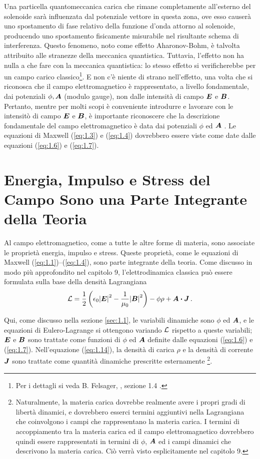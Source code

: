 Una particella quantomeccanica carica che rimane completamente all'esterno del solenoide sarà influenzata dal potenziale vettore in questa zona, ove esso causerà uno spostamento di fase relativo della funzione d'onda attorno al solenoide, producendo uno spostamento fisicamente misurabile nel risultante schema di interferenza. Questo fenomeno, noto come effetto Aharonov-Bohm, è talvolta attribuito alle stranezze della meccanica quantistica. Tuttavia, l'effetto non ha nulla a che fare con la meccanica quantistica: lo stesso effetto si verificherebbe per un campo carico classico\footnote{Per i dettagli si veda B. Felsager, , sezione 1.4 .}. 
E non c'è niente di strano nell'effetto, una volta che si riconosca che il campo elettromagnetico è rappresentato, a livello fondamentale, dai potenziali $\phi, \vb*{A}$ (modulo gauge), non dalle intensità di campo $\vb*{E}$ e $\vb*{B}$. Pertanto, mentre per molti scopi è conveniente introdurre e lavorare con le intensitò di campo $\vb*{E}$ e $\vb*{B}$, è importante riconoscere che la descrizione fondamentale del campo elettromagnetico è data dai potenziali $\phi$ ed $\vb*{A}$ . Le equazioni di Maxwell (\ref{eq:1.3}) e (\ref{eq:1.4}) dovrebbero essere viste come date dalle equazioni (\ref{eq:1.6}) e (\ref{eq:1.7}).


\section[Energia e Impulso del Campo]{Energia, Impulso e Stress del Campo Sono una Parte Integrante della Teoria}\label{sec:1.2}
Al campo elettromagnetico, come a tutte le altre forme di materia, sono associate le proprietà energia, impulso e stress. Queste proprietà, come le equazioni di Maxwell (\ref{eq:1.1})--(\ref{eq:1.4}), sono parte integrante della teoria. Come discusso in modo più approfondito nel capitolo 9, l'elettrodinamica classica può essere formulata sulla base della densità Lagrangiana  
\begin{equation}\label{eq:1.14}
\cL = \frac{1}{2} \left(\epsilon_0 {\abs{\vb*{E}}}^2 - \frac{1}{\mu_0} {\abs{\vb*{B}}}^2 \right) - \phi \rho + \vb*{A} \vdot \vb*{J}\,.
\end{equation}

Qui, come discusso nella sezione \ref{sec:1.1}, le variabili dinamiche sono $\phi$ ed $\vb*{A}$, e le equazioni di Eulero-Lagrange si ottengono variando $\mathcal{L}$ rispetto a queste variabili; $\vb*{E}$ e $\vb*{B}$ sono trattate come funzioni di $\phi$ ed $\vb*{A}$ definite dalle equazioni (\ref{eq:1.6}) e (\ref{eq:1.7}). Nell'equazione (\ref{eq:1.14}), la densità di carica $\rho$ e la densità di corrente $\vb*{J}$ sono trattate come quantità dinamiche prescritte esternamente
\footnote{Naturalmente, la materia carica dovrebbe realmente avere i propri gradi di libertà dinamici, e dovrebbero esserci termini aggiuntivi nella Lagrangiana che coinvolgono i campi che rappresentano la materia carica. I termini di accoppiamento tra la materia carica ed il campo elettromagnetico dovrebbero quindi essere rappresentati in termini di $\phi$, $\vb*{A}$ ed i campi dinamici che descrivono la materia carica. Ciò verrà visto esplicitamente nel capitolo 9.}. 

